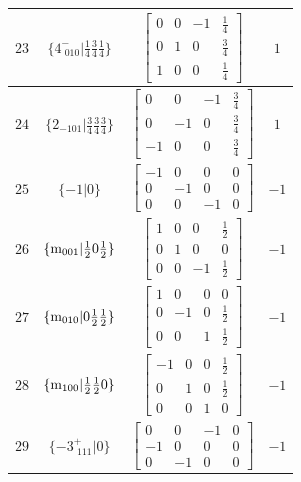 \documentclass[fleqn,8pt]{jsarticle}
\begin{document}
\begin{longtable}{cccc}
$ 23 $ & $ \{4^{-}_{\,\,010}|\frac{1}{4} \frac{3}{4} \frac{1}{4}\} $ & $ \begin{bmatrix} 0 & 0 & -1 & \frac{1}{4} \\ 0 & 1 & 0 & \frac{3}{4} \\ 1 & 0 & 0 & \frac{1}{4} \end{bmatrix} $ & $ 1 $ \\ \hline
$ 24 $ & $ \{2{}_{-101}|\frac{3}{4} \frac{3}{4} \frac{3}{4}\} $ & $ \begin{bmatrix} 0 & 0 & -1 & \frac{3}{4} \\ 0 & -1 & 0 & \frac{3}{4} \\ -1 & 0 & 0 & \frac{3}{4} \end{bmatrix} $ & $ 1 $ \\ \hline
$ 25 $ & $ \{-1|0\} $ & $ \begin{bmatrix} -1 & 0 & 0 & 0 \\ 0 & -1 & 0 & 0 \\ 0 & 0 & -1 & 0 \end{bmatrix} $ & $ -1 $ \\ \hline
$ 26 $ & $ \{{\rm m}_{001}|\frac{1}{2} 0 \frac{1}{2}\} $ & $ \begin{bmatrix} 1 & 0 & 0 & \frac{1}{2} \\ 0 & 1 & 0 & 0 \\ 0 & 0 & -1 & \frac{1}{2} \end{bmatrix} $ & $ -1 $ \\ \hline
$ 27 $ & $ \{{\rm m}_{010}|0 \frac{1}{2} \frac{1}{2}\} $ & $ \begin{bmatrix} 1 & 0 & 0 & 0 \\ 0 & -1 & 0 & \frac{1}{2} \\ 0 & 0 & 1 & \frac{1}{2} \end{bmatrix} $ & $ -1 $ \\ \hline
$ 28 $ & $ \{{\rm m}_{100}|\frac{1}{2} \frac{1}{2} 0\} $ & $ \begin{bmatrix} -1 & 0 & 0 & \frac{1}{2} \\ 0 & 1 & 0 & \frac{1}{2} \\ 0 & 0 & 1 & 0 \end{bmatrix} $ & $ -1 $ \\ \hline
$ 29 $ & $ \{-3^{+}_{\,\,111}|0\} $ & $ \begin{bmatrix} 0 & 0 & -1 & 0 \\ -1 & 0 & 0 & 0 \\ 0 & -1 & 0 & 0 \end{bmatrix} $ & $ -1 $ \\ \hline

\end{longtable}
\end{document}
